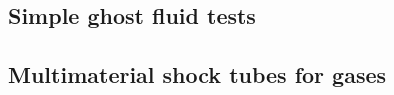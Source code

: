 \documentclass[final,3p,twocolumn,times]{elsarticle}
\begin{document}
\subsection{Simple ghost fluid tests}
\label{subsec:toro}

\subsection{Multimaterial shock tubes for gases}
\label{subsec:shocktubes}

%
%
%
%
%
\end{document}
